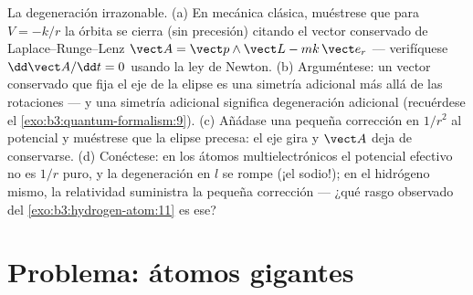 \begin{exercise}[$\star\star\star$]\label{exo:b3:hydrogen-atom:12}
La degeneración irrazonable. (a) En mecánica clásica, muéstrese que
para $V = -k/r$ la órbita se cierra (sin precesión) citando el
vector conservado de Laplace--Runge--Lenz $\vect A = \vect p\wedge\vect
L - mk\,\vect e_r$ --- verifíquese $\dd\vect A/\dd t = 0$ usando la ley de
Newton. (b) Arguméntese: un vector conservado que fija el eje de la elipse es
una simetría adicional más allá de las rotaciones --- y una simetría
adicional significa degeneración adicional (recuérdese el
\cref{exo:b3:quantum-formalism:9}). (c) Añádase una
pequeña corrección en $1/r^2$ al potencial y muéstrese que la elipse
precesa: el eje gira y $\vect A$ deja de conservarse. (d)
Conéctese: en los átomos multielectrónicos el potencial efectivo no es
$1/r$ puro, y la degeneración en $l$ se rompe (¡el sodio!); en el hidrógeno
mismo, la relatividad suministra la pequeña corrección --- ¿qué rasgo
observado del \cref{exo:b3:hydrogen-atom:11} es ese?
\end{exercise}

\section{Problema: átomos gigantes}

